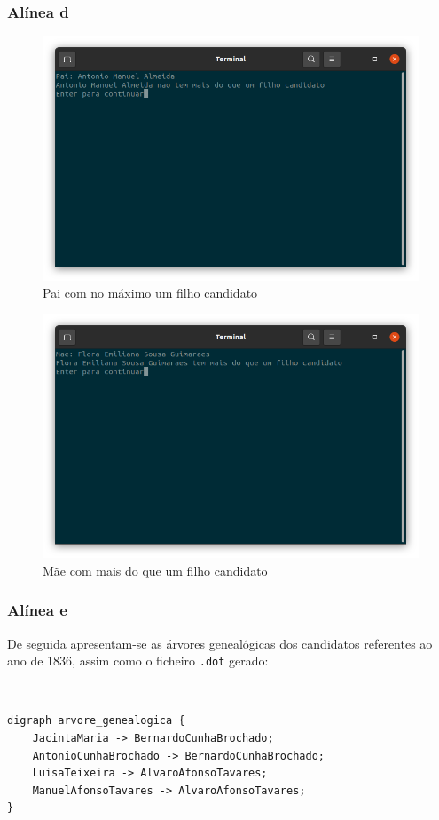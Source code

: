 \documentclass[a4paper, 11pt]{article}
\begin{document}
\subsubsection{Alínea d}

\begin{figure}[H]
    \centering
    \includegraphics[width=.8\textwidth]{img/pai.png}
    \caption{Pai com no máximo um filho candidato}
\end{figure}

\begin{figure}[H]
    \centering
    \includegraphics[width=.8\textwidth]{img/mae.png}
    \caption{Mãe com mais do que um filho candidato}
\end{figure}

\subsubsection{Alínea e}

De seguida apresentam-se as árvores genealógicas dos candidatos referentes ao ano de 1836, assim como
o ficheiro \texttt{.dot} gerado:

\

\begin{lstlisting}
digraph arvore_genealogica {
    JacintaMaria -> BernardoCunhaBrochado;
    AntonioCunhaBrochado -> BernardoCunhaBrochado;
    LuisaTeixeira -> AlvaroAfonsoTavares;
    ManuelAfonsoTavares -> AlvaroAfonsoTavares;
}
\end{lstlisting}
\end{document}
